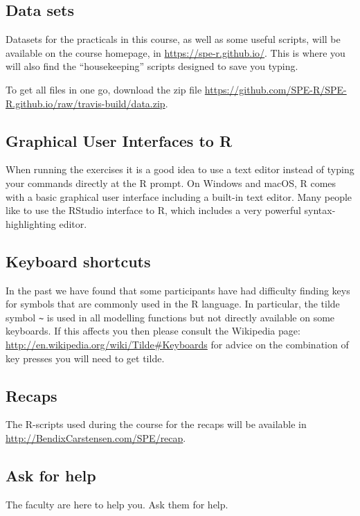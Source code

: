 
\subsection*{Data sets}

Datasets for the practicals in this course, as well as some useful \R
scripts, will be available on the course homepage, in
\url{https://spe-r.github.io/}. This is where you will
also find the ``housekeeping'' scripts designed to save you typing.

To get all files in one go, download the zip
file \url{https://github.com/SPE-R/SPE-R.github.io/raw/travis-build/data.zip}.

\subsection*{Graphical User Interfaces to R}

When running the exercises it is a good idea to use a text editor
instead of typing your commands directly at the R prompt. On Windows
and macOS, R comes with a basic graphical user interface including a
built-in text editor. Many people like to use the RStudio interface to
R, which includes a very powerful syntax-highlighting editor.

\subsection*{Keyboard shortcuts}

In the past we have found that some participants have had difficulty
finding keys for symbols that are commonly used in the R language.  In
particular, the tilde symbol \verb+~+ is used in all modelling
functions but not directly available on some keyboards. If this
affects you then please consult the Wikipedia
page: \url{http://en.wikipedia.org/wiki/Tilde#Keyboards} for advice on
the combination of key presses you will need to get tilde.

\subsection*{Recaps}
The R-scripts used during the course for the recaps will be available
in \url{http://BendixCarstensen.com/SPE/recap}.

\subsection*{Ask for help}

The faculty are here to help you. Ask them for help.


